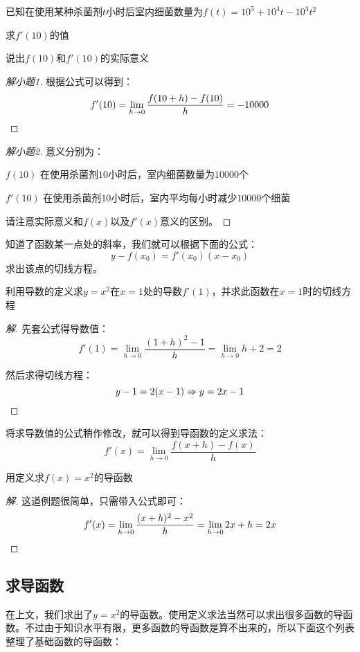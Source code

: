 \begin{example}
	已知在使用某种杀菌剂$t$小时后室内细菌数量为$f(t)=10^5+10^4t-10^3t^2$

	\begin{enumlist}
		\item 求$f'(10)$的值
		\item 说出$f(10)$和$f'(10)$的实际意义
	\end{enumlist}
\end{example}
\begin{proof}[解小题1]
	根据公式可以得到：\[f'(10)=\lim_{h\rightarrow 0}\frac{f(10+h)-f(10)}{h}=-10000\qedhere\]
\end{proof}
\begin{proof}[解小题2]
	意义分别为：

	\begin{desclist}
	\item[$f(10)$] 在使用杀菌剂$10$小时后，室内细菌数量为$10000$个
	\item[$f'(10)$] 在使用杀菌剂$10$小时后，室内平均每小时减少$10000$个细菌
	\end{desclist}

	请注意实际意义和$f(x)$以及$f'(x)$意义的区别。
\end{proof}

知道了函数某一点处的斜率，我们就可以根据下面的公式：\[y-f(x_0)=f'(x_0)(x-x_0)\]求出该点的切线方程。

\begin{example}
	利用导数的定义求$y=x^2$在$x=1$处的导数$f'(1)$，并求此函数在$x=1$时的切线方程
\end{example}
\begin{proof}[解]
	先套公式得导数值：\[f'(1)=\lim_{h\rightarrow 0}\frac{(1+h)^2-1}{h}=\lim_{h\rightarrow 0}h+2=2\]

	然后求得切线方程：\[y-1=2(x-1)\Rightarrow y=2x-1\qedhere\]
\end{proof}

将求导数值的公式稍作修改，就可以得到导函数的定义求法：\[f'(x)=\lim_{h\rightarrow 0}\frac{f(x+h)-f(x)}{h}\]

\begin{example}
	用定义求$f(x)=x^2$的导函数
\end{example}
\begin{proof}[解]
	这道例题很简单，只需带入公式即可：\[f'(x)=\lim_{h\rightarrow 0}\frac{(x+h)^2-x^2}{h}=\lim_{h\rightarrow 0}2x+h=2x\qedhere\]
\end{proof}

\subsection{求导函数}
在上文，我们求出了$y=x^2$的导函数。使用定义求法当然可以求出很多函数的导函数。不过由于知识水平有限，更多函数的导函数是算不出来的，所以下面这个列表整理了基础函数的导函数：

